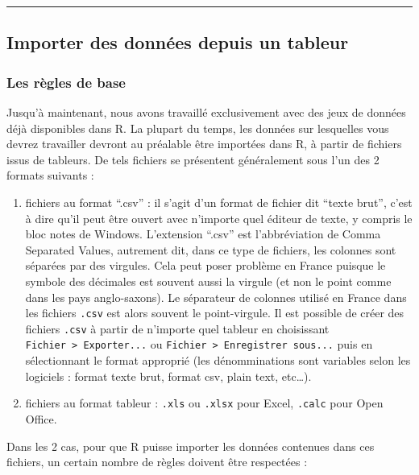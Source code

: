\documentclass[a4paperpaper,]{article}
\providecommand{\tightlist}{%
  \setlength{\itemsep}{0pt}\setlength{\parskip}{0pt}}
\begin{document}
\begin{center}\rule{0.5\linewidth}{\linethickness}\end{center}

\hypertarget{importer-des-donnees-depuis-un-tableur}{%
\subsection{Importer des données depuis un tableur}\label{importer-des-donnees-depuis-un-tableur}}

\hypertarget{les-regles-de-base}{%
\subsubsection{Les règles de base}\label{les-regles-de-base}}

Jusqu'à maintenant, nous avons travaillé exclusivement avec des jeux de données déjà disponibles dans R. La plupart du temps, les données sur lesquelles vous devrez travailler devront au préalable être importées dans R, à partir de fichiers issus de tableurs. De tels fichiers se présentent généralement sous l'un des 2 formats suivants :

\begin{enumerate}
\def\labelenumi{\arabic{enumi}.}
\tightlist
\item
  fichiers au format ``.csv'' : il s'agit d'un format de fichier dit ``texte brut'', c'est à dire qu'il peut être ouvert avec n'importe quel éditeur de texte, y compris le bloc notes de Windows. L'extension ``.csv'' est l'abbréviation de Comma Separated Values, autrement dit, dans ce type de fichiers, les colonnes sont séparées par des virgules. Cela peut poser problème en France puisque le symbole des décimales est souvent aussi la virgule (et non le point comme dans les pays anglo-saxons). Le séparateur de colonnes utilisé en France dans les fichiers \texttt{.csv} est alors souvent le point-virgule. Il est possible de créer des fichiers \texttt{.csv} à partir de n'importe quel tableur en choisissant \texttt{Fichier\ \textgreater{}\ Exporter...} ou \texttt{Fichier\ \textgreater{}\ Enregistrer\ sous...} puis en sélectionnant le format approprié (les dénomminations sont variables selon les logiciels : format texte brut, format csv, plain text, etc\ldots{}).
\item
  fichiers au format tableur : \texttt{.xls} ou \texttt{.xlsx} pour Excel, \texttt{.calc} pour Open Office.
\end{enumerate}

Dans les 2 cas, pour que R puisse importer les données contenues dans ces fichiers, un certain nombre de règles doivent être respectées :
\end{document}
